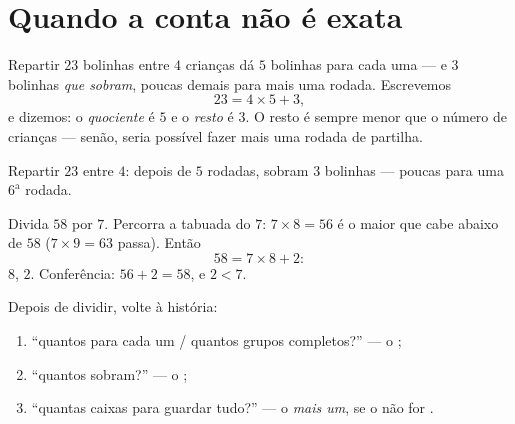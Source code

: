 \section{Quando a conta não é exata}

\begin{definition}[Resto]\label{def:g3:division:remainder}
Repartir $23$ bolinhas entre $4$ crianças dá $5$ bolinhas para cada
uma --- e $3$ bolinhas \emph{que sobram}, poucas demais para mais
uma rodada. Escrevemos
\[
23 = 4 \times 5 + 3 ,
\]
e dizemos: o \emph{quociente} é $5$ e o
\emph{resto} é $3$. O resto é sempre menor que o número
de crianças --- senão, seria possível fazer mais uma rodada de
partilha.
\end{definition}

\begin{omfigure}

{\small Repartir $23$ entre $4$: depois de $5$ rodadas, sobram $3$
bolinhas --- poucas para uma $6^{\text{a}}$ rodada.}
\end{omfigure}

\begin{example}\label{ex:g3:division:remainder}
Divida $58$ por $7$. Percorra a tabuada do $7$: $7 \times 8 = 56$ é
o maior  que cabe abaixo de $58$ ($7 \times 9 = 63$ passa).
Então
\[
58 = 7 \times 8 + 2 :
\]
 $8$,  $2$. Conferência: $56 + 2 = 58$, e $2 < 7$.
\end{example}

\begin{method}\label{met:g3:division:interpret}
Depois de dividir, volte à história:
\begin{enumerate}
  \item ``quantos para cada um / quantos grupos completos?'' --- o
        ;
  \item ``quantos sobram?'' --- o ;
  \item ``quantas caixas para guardar tudo?'' --- o 
        \emph{mais um}, se o  não for .
\end{enumerate}
\end{method}

